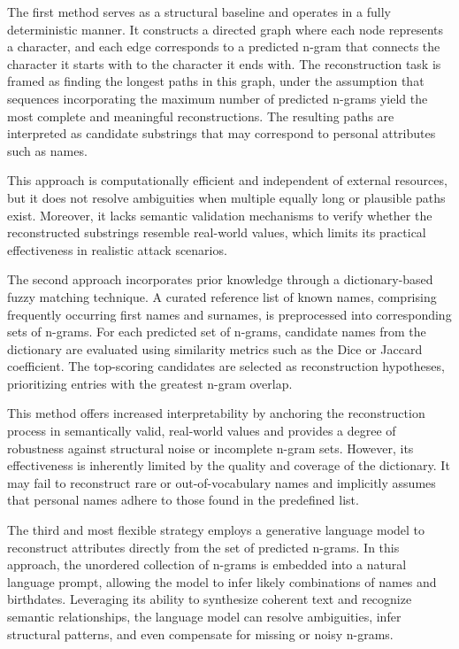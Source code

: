 The first method serves as a structural baseline and operates in a fully deterministic manner.
It constructs a directed graph where each node represents a character, and each edge corresponds to a predicted n-gram that connects the character it starts with to the character it ends with.
The reconstruction task is framed as finding the longest paths in this graph, under the assumption that sequences incorporating the maximum number of predicted n-grams yield the most complete and meaningful reconstructions.
The resulting paths are interpreted as candidate substrings that may correspond to personal attributes such as names.

This approach is computationally efficient and independent of external resources, but it does not resolve ambiguities when multiple equally long or plausible paths exist.
Moreover, it lacks semantic validation mechanisms to verify whether the reconstructed substrings resemble real-world values, which limits its practical effectiveness in realistic attack scenarios.

The second approach incorporates prior knowledge through a dictionary-based fuzzy matching technique.
A curated reference list of known names, comprising frequently occurring first names and surnames, is preprocessed into corresponding sets of n-grams.
For each predicted set of n-grams, candidate names from the dictionary are evaluated using similarity metrics such as the Dice or Jaccard coefficient.
The top-scoring candidates are selected as reconstruction hypotheses, prioritizing entries with the greatest n-gram overlap.

This method offers increased interpretability by anchoring the reconstruction process in semantically valid, real-world values and provides a degree of robustness against structural noise or incomplete n-gram sets.
However, its effectiveness is inherently limited by the quality and coverage of the dictionary.
It may fail to reconstruct rare or out-of-vocabulary names and implicitly assumes that personal names adhere to those found in the predefined list.

The third and most flexible strategy employs a generative language model to reconstruct attributes directly from the set of predicted n-grams.
In this approach, the unordered collection of n-grams is embedded into a natural language prompt, allowing the model to infer likely combinations of names and birthdates.
Leveraging its ability to synthesize coherent text and recognize semantic relationships, the language model can resolve ambiguities, infer structural patterns, and even compensate for missing or noisy n-grams.

